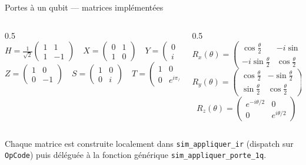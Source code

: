 \documentclass[10pt]{beamer}
\begin{document}
\begin{frame}{Portes à un qubit --- matrices implémentées}
  \small
  \begin{columns}[T]
    \begin{column}{0.5\textwidth}
      \[
        H = \tfrac{1}{\sqrt2}\begin{pmatrix}1&1\\1&-1\end{pmatrix} \quad
        X = \begin{pmatrix}0&1\\1&0\end{pmatrix} \quad
        Y = \begin{pmatrix}0&-i\\i&0\end{pmatrix}
      \]
      \[
        Z = \begin{pmatrix}1&0\\0&-1\end{pmatrix} \quad
        S = \begin{pmatrix}1&0\\0&i\end{pmatrix} \quad
        T = \begin{pmatrix}1&0\\0&e^{i\pi/4}\end{pmatrix}
      \]
    \end{column}
    \begin{column}{0.5\textwidth}
      \[
        R_x(\theta) = \begin{pmatrix}\cos\frac{\theta}{2} & -i\sin\frac{\theta}{2}\\-i\sin\frac{\theta}{2} & \cos\frac{\theta}{2}\end{pmatrix}
      \]
      \[
        R_y(\theta) = \begin{pmatrix}\cos\frac{\theta}{2} & -\sin\frac{\theta}{2}\\ \sin\frac{\theta}{2} & \cos\frac{\theta}{2}\end{pmatrix}
      \]
      \[
        R_z(\theta) = \begin{pmatrix}e^{-i\theta/2} & 0\\0 & e^{i\theta/2}\end{pmatrix}
      \]
    \end{column}
  \end{columns}
  \vspace{4pt}
  {\footnotesize Chaque matrice est construite localement dans \texttt{sim\_appliquer\_ir} (dispatch sur \texttt{OpCode}) puis déléguée à la fonction générique \texttt{sim\_appliquer\_porte\_1q}.}
\end{frame}
\end{document}
